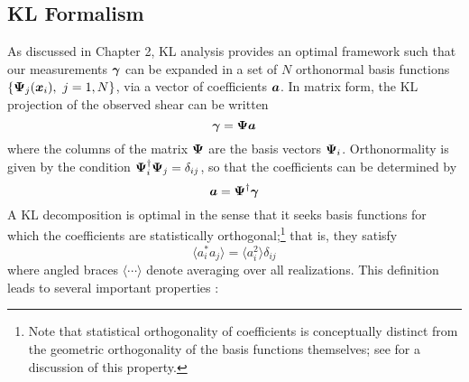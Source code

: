 \subsection{KL Formalism}
\label{KL_Formalism}
As discussed in Chapter 2, KL analysis provides an optimal framework
such that our measurements $\boldsymbol{\gamma}$ 
can be expanded in a set of $N$ orthonormal basis functions 
$\left\{ \boldsymbol{\Psi}_j(\boldsymbol{x}_i),\ j=1,N\right\}$, via a vector of
coefficients $\boldsymbol{a}$.  
In matrix form, the KL projection of the observed shear can be written
\begin{equation}
  \boldsymbol{\gamma} = \boldsymbol{\Psi}\boldsymbol{a}
\end{equation}
where the columns of the matrix $\boldsymbol{\Psi}$ are the basis vectors 
$\boldsymbol{\Psi}_i$.  Orthonormality is given by the condition 
$\boldsymbol{\Psi}_i^\dagger\boldsymbol{\Psi}_j = \delta_{ij}$, so that the coefficients
can be determined by
\begin{equation}
  \boldsymbol{a} = \boldsymbol{\Psi}^\dagger\boldsymbol{\gamma}
\end{equation}
A KL decomposition is optimal in the sense that it seeks basis 
functions for which the 
coefficients are statistically orthogonal;\footnote{Note that statistical
orthogonality of coefficients is conceptually distinct from the 
geometric orthogonality of the basis functions themselves; 
see \citet{Vogeley96} for a discussion of this property.}
that is, they satisfy
\begin{equation}
  \langle a_i^* a_j \rangle = \langle a_i^2 \rangle \delta_{ij}
\end{equation}
where angled braces $\langle\cdots\rangle$ denote averaging over all 
realizations.  This definition leads to several important properties
\citep[see][for a thorough discussion \& derivation]{Vogeley96}:
